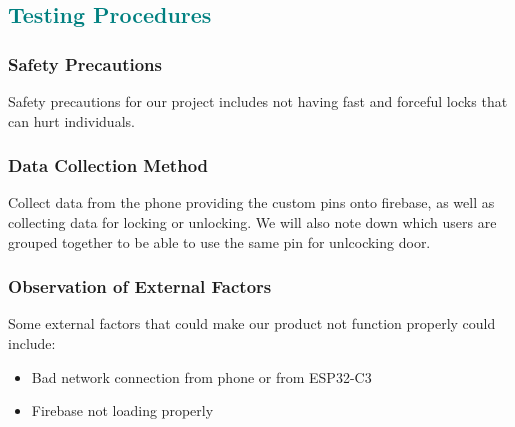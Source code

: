 \documentclass[a4paper,12pt]{article}
\begin{document}
\textcolor{teal}{\subsection*{Testing Procedures}}
\subsubsection{Safety Precautions}
Safety precautions for our project includes not having fast and forceful locks that can hurt individuals.

\subsubsection{Data Collection Method}
Collect data from the phone providing the custom pins onto firebase, as well as collecting data for locking or unlocking. We will also note down which users are grouped together to be able to use the same pin for unlcocking door.

\subsubsection{Observation of External Factors}
Some external factors that could make our product not function properly could include:

\begin{itemize}
    \item Bad network connection from phone or from ESP32-C3
    \item Firebase not loading properly
\end{itemize}


\end{document}
